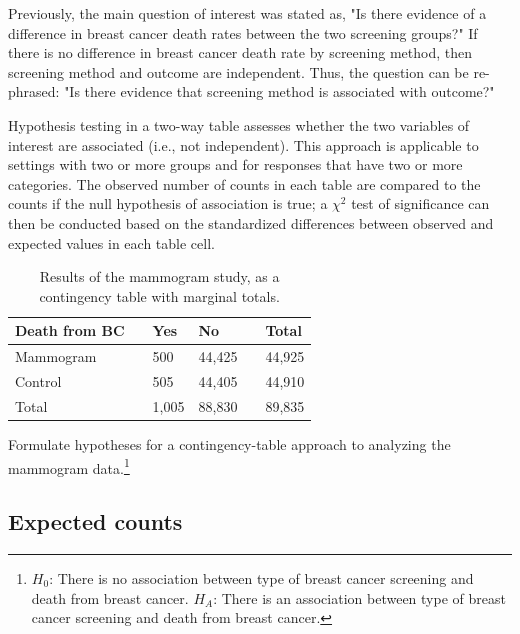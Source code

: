 Previously, the main question of interest was stated as, "Is there evidence of a difference in breast cancer death rates between the two screening groups?" If there is no difference in breast cancer death rate by screening method, then screening method and outcome are independent. Thus, the question can be re-phrased: "Is there evidence that screening method is associated with outcome?"

Hypothesis testing in a two-way table assesses whether the two variables of interest are associated (i.e., not independent). This approach is applicable to settings with two or more groups and for responses that have two or more categories. The observed number of counts in each table are compared to the  counts if the null hypothesis of association is true; a $\chi^2$ test of significance can then be conducted based on the standardized differences between observed and expected values in each table cell.

\begin{table}[h]
	\centering
	\begin{tabular}{l| l l l l |l}
		\hline
		Death from BC & \hspace{1mm}  & Yes & No & \hspace{1mm} & Total \\
		\hline
		Mammogram				   &    & 500 & 44,425 & 				&44,925 \\
		Control				   &     & 505	& 44,405    &				& 44,910 \\
		\hline
		Total						   &    & 1,005 & 88,830 & 				& 89,835 \\
		\hline
	\end{tabular}
	\caption{Results of the mammogram study, as a contingency table with marginal totals.}
	\label{mammogramStudySummaryTableWithTotals}
\end{table}

\begin{exercise}Formulate hypotheses for a contingency-table approach to analyzing the mammogram data.\footnote{$H_0$: There is no association between type of breast cancer screening and death from breast cancer. $H_A$: There is an association between type of breast cancer screening and death from breast cancer.}

\end{exercise}

\subsection{Expected counts}

